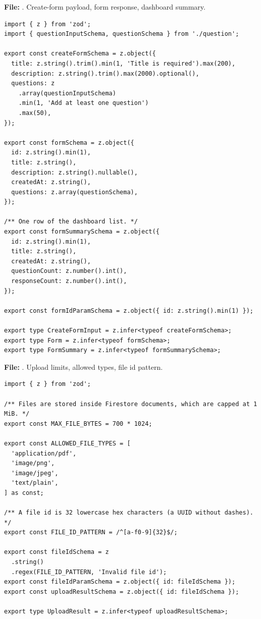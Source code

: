 \documentclass[11pt,a4paper]{article}
\begin{document}
\textbf{File:} . Create-form payload, form response, dashboard summary.\par
\begin{lstlisting}
import { z } from 'zod';
import { questionInputSchema, questionSchema } from './question';

export const createFormSchema = z.object({
  title: z.string().trim().min(1, 'Title is required').max(200),
  description: z.string().trim().max(2000).optional(),
  questions: z
    .array(questionInputSchema)
    .min(1, 'Add at least one question')
    .max(50),
});

export const formSchema = z.object({
  id: z.string().min(1),
  title: z.string(),
  description: z.string().nullable(),
  createdAt: z.string(),
  questions: z.array(questionSchema),
});

/** One row of the dashboard list. */
export const formSummarySchema = z.object({
  id: z.string().min(1),
  title: z.string(),
  createdAt: z.string(),
  questionCount: z.number().int(),
  responseCount: z.number().int(),
});

export const formIdParamSchema = z.object({ id: z.string().min(1) });

export type CreateFormInput = z.infer<typeof createFormSchema>;
export type Form = z.infer<typeof formSchema>;
export type FormSummary = z.infer<typeof formSummarySchema>;
\end{lstlisting}

\textbf{File:} . Upload limits, allowed types, file id pattern.\par
\begin{lstlisting}
import { z } from 'zod';

/** Files are stored inside Firestore documents, which are capped at 1 MiB. */
export const MAX_FILE_BYTES = 700 * 1024;

export const ALLOWED_FILE_TYPES = [
  'application/pdf',
  'image/png',
  'image/jpeg',
  'text/plain',
] as const;

/** A file id is 32 lowercase hex characters (a UUID without dashes). */
export const FILE_ID_PATTERN = /^[a-f0-9]{32}$/;

export const fileIdSchema = z
  .string()
  .regex(FILE_ID_PATTERN, 'Invalid file id');
export const fileIdParamSchema = z.object({ id: fileIdSchema });
export const uploadResultSchema = z.object({ id: fileIdSchema });

export type UploadResult = z.infer<typeof uploadResultSchema>;
\end{lstlisting}
\end{document}
